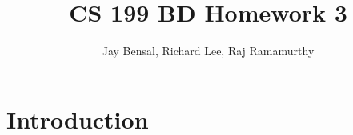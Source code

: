 \documentclass{article}
\begin{document}
\title{CS 199 BD Homework 3}
\author{Jay Bensal, Richard Lee, Raj Ramamurthy}

\maketitle

\section{Introduction}
\end{document}
